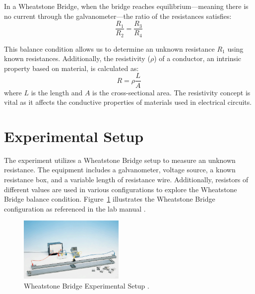 \documentclass[journal]{IEEEtran}
\begin{document}
In a Wheatstone Bridge, when the bridge reaches equilibrium—meaning there is no current through the galvanometer—the ratio of the resistances satisfies:
\begin{equation}
    \frac{R_1}{R_2} = \frac{R_3}{R_4}
    \label{eq:wheatstone}
\end{equation}

This balance condition allows us to determine an unknown resistance \( R_1 \) using known resistances. Additionally, the resistivity (\(\rho\)) of a conductor, an intrinsic property based on material, is calculated as:
\begin{equation}
    R = \rho \frac{L}{A}
    \label{eq:resistivity}
\end{equation}
where \(L\) is the length and \(A\) is the cross-sectional area. The resistivity concept is vital as it affects the conductive properties of materials used in electrical circuits.

\section{Experimental Setup}
The experiment utilizes a Wheatstone Bridge setup to measure an unknown resistance. The equipment includes a galvanometer, voltage source, a known resistance box, and a variable length of resistance wire. Additionally, resistors of different values are used in various configurations to explore the Wheatstone Bridge balance condition. Figure~\ref{fig:setup} illustrates the Wheatstone Bridge configuration as referenced in the lab manual \cite{lab_manual}.

\begin{figure}[H]
    \centering
    \includegraphics[width=0.45\textwidth]{IMAGES/wheatstone_bridge.png} %
    \caption{Wheatstone Bridge Experimental Setup \cite{lab_manual}.}
    \label{fig:setup}
\end{figure}
\end{document}
